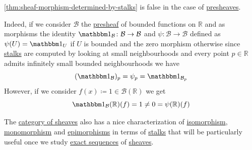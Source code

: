 \documentclass[../../main]{subfiles}
\begin{document}
\begin{example}
  \autoref{thm:sheaf-morphism-determined-by-stalks} is false in the case of \hyperref[def:presheaf]{presheaves}.

  Indeed, if we consider \(\mathcal{B}\) the \hyperref[def:presheaf]{presheaf} of bounded functions on \(\mathbb{R}\) and as morphisms the identity \(\id_{\mathcal{B}}\colon \mathcal{B} \to \mathcal{B}\) and \(\psi\colon \mathcal{B} \to \mathcal{B}\) defined as \(\psi(U) = \id_{U}\) if \(U\) is bounded and the zero morphism otherwise since \hyperref[def:stalk]{stalks} are computed by looking at small neighbourhoods and every point \(p \in \mathbb{R}\) admits infinitely small bounded neighbourhoods we have
  \begin{equation*}
    (\id_{\mathcal{B}})_{p} = \psi_{p} = \id_{\mathcal{B}_{p}}
  \end{equation*}
  However, if we consider \(f(x) \coloneq 1 \in \mathcal{B}(\mathbb{R})\) we get
  \begin{equation*}
    \id_{\mathcal{B}}(\mathbb{R})(f) = 1 \neq 0 = \psi(\mathbb{R})(f)
  \end{equation*}
\end{example}

The \hyperref[def:sheaf]{category of sheaves} also has a nice characterization of \hyperref[def:categorical-isomorphism]{isomorphism}, \hyperref[def:mono-epi-morphism]{monomorphism} and \hyperref[def:mono-epi-morphism]{epimorphisms} in terms of \hyperref[def:stalk]{stalks} that will be particularly useful once we study \hyperref[def:exact-sequence]{exact sequences} of \hyperref[def:sheaf]{sheaves}.
\end{document}
